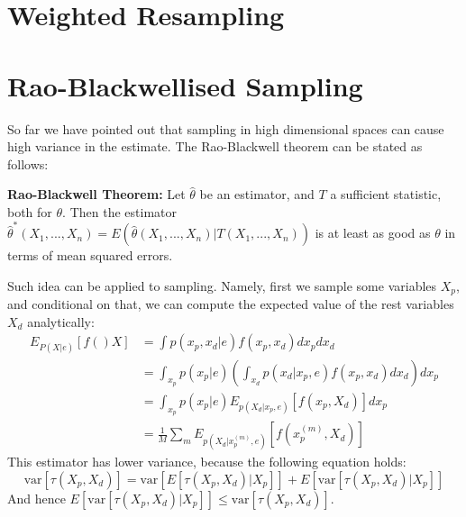 \documentclass[twoside]{article}
\begin{document}
\section{Weighted Resampling}
\section{Rao-Blackwellised Sampling}
So far we have pointed out that sampling in high dimensional spaces can cause high variance in the estimate. The Rao-Blackwell theorem can be stated as follows:

\textbf{Rao-Blackwell Theorem:} Let $\hat{\theta}$ be an estimator, and $T$ a sufficient statistic, both for $\theta$. Then the estimator $\hat{\theta}^*(X_1,...,X_n)=E(\hat{\theta}(X_1,...,X_n)|T(X_1,...,X_n))$ is at least as good as $\theta$ in terms of mean squared errors.

Such idea can be applied to sampling. Namely, first we sample some variables $X_p$, and conditional on that, we can compute the expected value of the rest variables $X_d$ analytically:
\begin{align*}
E_{P(X|e)}[f()X] &= \int p(x_p,x_d|e)f(x_p,x_d)dx_pdx_d\\
&=\int_{x_p}p(x_p|e)\left(\int_{x_d}p(x_d|x_p,e)f(x_p,x_d)dx_d\right)dx_p\\
&=\int_{x_p}p(x_p|e)E_{p(X_d|x_p,e)}[f(x_p,X_d)]dx_p\\
&=\frac{1}{M}\sum_mE_{p(X_d|x_p^{(m)},e)}[f(x_p^{(m)},X_d)]
\end{align*}
This estimator has lower variance, because the following equation holds:
\[\text{var}[\tau(X_p,X_d)]=\text{var}[E[\tau(X_p,X_d)|X_p]]+E[\text{var}[\tau(X_p,X_d)|X_p]]\]
And hence $E[\text{var}[\tau(X_p,X_d)|X_p]]\leq\text{var}[\tau(X_p,X_d)]$.
\end{document}
